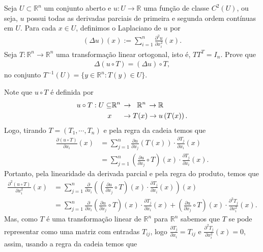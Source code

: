 \begin{homeworkProblem}[Seção 2-10]
  Seja $U \subset \mathbb{R}^n$ um conjunto aberto e $u : U \to \mathbb{R}$ uma função de classe $C^2(U)$, ou seja, $u$ possui todas as derivadas parciais de primeira e segunda ordem contínuas em $U$. Para cada $x \in U$, definimos o Laplaciano de $u$ por
    \begin{align*}
    (\Delta u)(x) := \sum_{i=1}^n \frac{\partial^2 u}{\partial x_i^2}(x).
    \end{align*}
    Seja $T : \mathbb{R}^n \to \mathbb{R}^n$ uma transformação linear ortogonal, isto é, $T T^T = I_n$. Prove que
    \begin{align*}
    \Delta (u \circ T) = (\Delta u) \circ T,
    \end{align*}
    no conjunto $T^{-1}(U) = \{y \in \mathbb{R}^n : T(y) \in U\}$.
  \begin{solution}
    Note que $u\circ T$ é definida por
    \begin{align*}
      u\circ T: U\subseteq & \mathbb{R}^{n}\,\to\hspace{0.2cm}\mathbb{R}^{n}\,\to\mathbb{R}\\
      x&\hspace{0.5cm}\to T(x)\to u\left(T(x)\right).
    \end{align*}
    Logo, tirando $T=(T_1,\cdots,T_n)$ e pela regra da cadeia temos que
    \begin{align*}
      \frac{\partial (u\circ T)}{\partial x_i}(x)&=\sum_{j=1}^{n}\frac{\partial u}{\partial x_j}(T(x))\cdot \frac{\partial T_j}{\partial x_i}(x)\\
      &=\sum_{j=1}^{n}\left( \frac{\partial u}{\partial x_j}\circ T \right)(x)\cdot \frac{\partial T_j}{\partial x_i}(x).
    \end{align*}
    Portanto, pela linearidade da derivada parcial e pela regra do produto, temos que
    \begin{align*}
      \frac{\partial^{2} (u\circ T)}{\partial x_i^{2}}(x)&=\sum_{j=1}^{n}\frac{\partial }{\partial x_i}\left(\left( \frac{\partial u}{\partial x_j}\circ T \right)(x)\cdot \frac{\partial T_j}{\partial x_i}(x)\right)(x)\\
      &=\sum_{j=1}^{n}\frac{\partial }{\partial x_i}\left( \frac{\partial u}{\partial x_j}\circ T \right)(x)\cdot \frac{\partial T_j}{\partial x_i}(x)+\left( \frac{\partial u}{\partial x_j}\circ T \right)(x)\cdot \frac{\partial^{2} T_j}{\partial x_i^{2}}(x).
    \end{align*}
    Mas, como $T$ é uma transformação linear de $\mathbb{R}^{n}$ para $\mathbb{R}^{n}$ sabemos que $T$ se pode representar como uma matriz com entradas $T_{ij}$, logo $\displaystyle \frac{\partial T_j}{\partial x_i}=T_{ij}$ e $\displaystyle \frac{\partial^{2} T_j}{\partial x_i^{2}}(x)=0$, assim, usando a regra da cadeia temos que

\end{solution}
\end{homeworkProblem}

